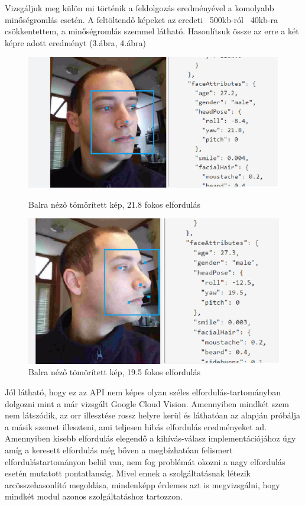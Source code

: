Vizsgáljuk meg külön mi történik a feldolgozás eredményével a komolyabb minőségromlás esetén. A feltöltendő képeket az eredeti ~500kb-ról ~40kb-ra csökkentettem, a minőségromlás szemmel látható. Hasonlítsuk össze az erre a két képre adott eredményt (3.ábra, 4.ábra)
\begin{figure}[h]
 \begin{minipage}{.5\textwidth} 
\centering
    \includegraphics[scale=0.3]{img/mpo_left_compressed}
    \caption{Balra néző tömörített kép, 21.8 fokos elfordulás}
 \end{minipage}
 \begin{minipage}{.5\textwidth} 
\centering
     \includegraphics[scale=0.3]{img/mpo_very_left_compressed}
     \caption{Balra néző tömörített kép, 19.5 fokos elfordulás}
 \end{minipage}
\end{figure}

Jól látható, hogy ez az API nem képes olyan széles elfordulás-tartományban dolgozni mint a már vizsgált Google Cloud Vision. Amennyiben mindkét szem nem látszódik, az orr illesztése rossz helyre kerül és láthatóan az alapján próbálja a másik szemet illeszteni, ami teljesen hibás elfordulás eredményeket ad. Amennyiben kisebb elfordulás elegendő a kihívás-válasz implementációjához úgy amíg a keresett elfordulás még bőven a megbízhatóan felismert elfordulástartományon belül van, nem fog problémát okozni a nagy elfordulás esetén mutatott pontatlanság. Mivel ennek a szolgáltatásnak létezik arcösszehasonlító megoldása, mindenképp érdemes azt is megvizsgálni, hogy mindkét modul azonos szolgáltatáshoz tartozzon.

